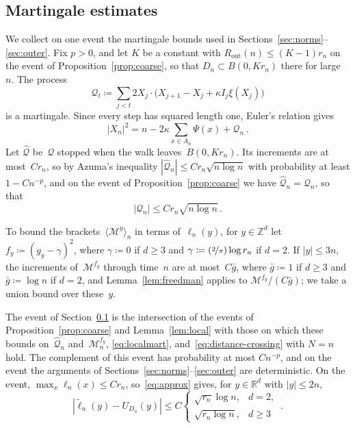 \documentclass[11pt]{amsart}
\theoremstyle{plain}
\theoremstyle{definition}
\newcommand{\Z}{\mathbb Z}
\newcommand{\R}{\mathbb R}
\newcommand{\drift}{\kappa}
\newcommand{\gauge}{\Psi}
\newcommand{\nf}{\nicefrac}
\newcommand{\Rout}{R_{\mathrm{out}}}
\numberwithin{equation}{section}
\begin{document}
\subsection{Martingale estimates}\label{sec:norm-event}

We collect on one event the martingale bounds used in Sections~\ref{sec:norms}--\ref{sec:outer}. Fix $p>0$, and let $K$ be a constant with $\Rout(n)\leq(K-1)r_n$ on the event of Proposition~\ref{prop:coarse}, so that $D_n\subset B(0,Kr_n)$ there for large~$n$. The process
\begin{equation*}
\mathcal Q_t\coloneqq\sum_{j<t}2X_j\cdot\bigl(X_{j+1}-X_j+\drift I_j\xi(X_j)\bigr)
\end{equation*}
is a martingale. Since every step has squared length one, Euler's relation gives
\begin{equation}\label{eq:quadratic}
|X_n|^2=n-2\drift\sum_{x\in A_n}\gauge(x)+\mathcal Q_n\, .
\end{equation}
Let $\widehat{\mathcal Q}$ be~$\mathcal Q$ stopped when the walk leaves~$B(0,Kr_n)$. Its increments are at most~$Cr_n$, so by Azuma's inequality $|\widehat{\mathcal Q}_n|\leq Cr_n\sqrt{n\log n}$ with probability at least $1-Cn^{-p}$, and on the event of Proposition~\ref{prop:coarse} we have $\widehat{\mathcal Q}_n=\mathcal Q_n$, so that
\begin{equation}\label{eq:quadraticerror}
|\mathcal Q_n|\leq Cr_n\sqrt{n\log n}\, .
\end{equation}

To bound the brackets~$\langle\mathcal M^y\rangle_n$ in terms of~$\ell_n(y)$, for $y\in\Z^d$ let $f_y\coloneqq(g_y-\gamma)^2$, where $\gamma\coloneqq0$ if $d\geq3$ and $\gamma\coloneqq(\nf2\pi)\log r_n$ if $d=2$. If $|y|\leq3n$, the increments of~$\mathcal M^{f_y}$ through time~$n$ are at most~$C\bar g$, where $\bar g\coloneqq1$ if $d\geq3$ and $\bar g\coloneqq\log n$ if $d=2$, and Lemma~\ref{lem:freedman} applies to $\mathcal M^{f_y}/(C\bar g)$; we take a union bound over these~$y$.

The event of Section~\ref{sec:norm-event} is the intersection of the events of Proposition~\ref{prop:coarse} and Lemma~\ref{lem:local} with those on which these bounds on~$\widehat{\mathcal Q}_n$ and~$\mathcal M^{f_y}_n$, \eqref{eq:localmart}, and~\eqref{eq:distance-crossing} with $N=n$ hold. The complement of this event has probability at most $Cn^{-p}$, and on the event the arguments of Sections~\ref{sec:norms}--\ref{sec:outer} are deterministic. On the event, $\max_x\ell_n(x)\leq Cr_n$, so~\eqref{eq:approx} gives, for $y\in\R^d$ with $|y|\leq2n$,
\begin{equation}\label{eq:norm-approx}
|\widetilde\ell_n(y)-U_{D_n}(y)|\leq C\begin{cases}\sqrt{r_n}\log n,&d=2,\\\sqrt{r_n\log n},&d\geq3\end{cases}\, .
\end{equation}
\end{document}
